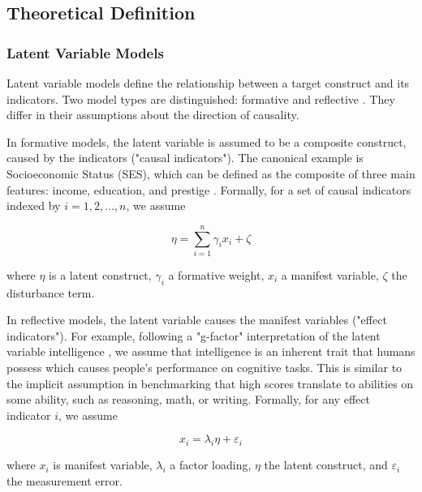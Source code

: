 \subsection{Theoretical Definition}\label{sec:theoretical_definition}

\subsubsection{Latent Variable Models}

Latent variable models define the relationship between a target construct and its indicators. Two model types are distinguished: formative and reflective \citep{bollen1991conventional}. They differ in their assumptions about the direction of causality. 

In formative models, the latent variable is assumed to be a composite construct, caused by the indicators ("causal indicators"). The canonical example is Socioeconomic Status (SES), which can be defined as the composite of three main features: income, education, and prestige \citep{mcquitty2013structural}. Formally, for a set of causal indicators indexed by $i = 1,2, \dots ,n$, we assume

\begin{equation}\label{eq:formative_model}
    \eta = \sum_{i=1}^{n} \gamma_i x_i + \zeta
\end{equation}

where $\eta$ is a latent construct, $\gamma_i$ a formative weight, $x_i$ a manifest variable, $\zeta$ the disturbance term. 

In reflective models, the latent variable causes the manifest variables ("effect indicators"). For example, following a "g-factor" interpretation of the latent variable intelligence \citep{spearman1961general}, we assume that intelligence is an inherent trait that humans possess which causes people's performance on cognitive tasks. This is similar to the implicit assumption in benchmarking that high scores translate to abilities on some ability, such as reasoning, math, or writing. Formally, for any effect indicator $i$, we assume

\begin{equation}\label{eq:reflective_model}
    x_i = \lambda_i \eta + \varepsilon_i
\end{equation}

where $x_i$ is manifest variable, $\lambda_i$ a factor loading, $\eta$ the latent construct, and $\varepsilon_i$ the measurement error.


